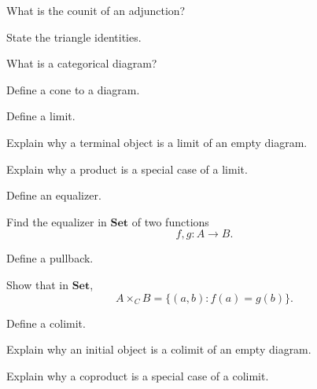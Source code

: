 \begin{exercise}[1]
What is the counit of an adjunction?
\end{exercise}

\begin{exercise}[2]
State the triangle identities.
\end{exercise}

\begin{exercise}[1]
What is a categorical diagram?
\end{exercise}

\begin{exercise}[1]
Define a cone to a diagram.
\end{exercise}

\begin{exercise}[1]
Define a limit.
\end{exercise}

\begin{exercise}[2]
Explain why a terminal object is a limit of an empty diagram.
\end{exercise}

\begin{exercise}[2]
Explain why a product is a special case of a limit.
\end{exercise}

\begin{exercise}[1]
Define an equalizer.
\end{exercise}

\begin{exercise}[2]
Find the equalizer in \(\mathbf{Set}\) of two functions
\[ f,g:A\to B. \]
\end{exercise}

\begin{exercise}[1]
Define a pullback.
\end{exercise}

\begin{exercise}[2]
Show that in \(\mathbf{Set}\),
\[ A\times_C B=\{(a,b):f(a)=g(b)\}. \]
\end{exercise}

\begin{exercise}[1]
Define a colimit.
\end{exercise}

\begin{exercise}[2]
Explain why an initial object is a colimit of an empty diagram.
\end{exercise}

\begin{exercise}[2]
Explain why a coproduct is a special case of a colimit.
\end{exercise}

